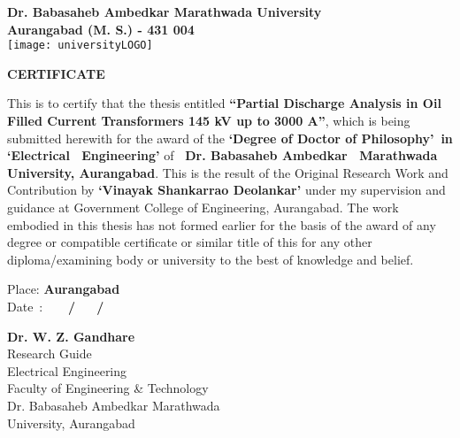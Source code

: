 \begin{center}
\large \textbf{Dr. Babasaheb Ambedkar Marathwada University\\
Aurangabad (M. S.) - 431 004}\\
\vspace{0.5cm}
\texttt{[image: universityLOGO]}\\
\vspace{0.5cm}
\textbf{\large CERTIFICATE}\\
\end{center}
\normalsize This is to certify that the thesis entitled \textbf{\textquotedblleft Partial Discharge Analysis in Oil Filled Current Transformers 145 kV up to 3000 A\textquotedblright}, which is being submitted herewith for the award of the \textbf{\textquoteleft Degree of Doctor of Philosophy\textquoteright ~in \textquoteleft Electrical ~Engineering\textquoteright} of \textbf{~Dr. Babasaheb Ambedkar ~Marathwada University, Aurangabad}. This is the result of the Original Research Work and Contribution by \textbf{\textquoteleft Vinayak Shankarrao Deolankar\textquoteright} under my supervision and guidance at Government College of Engineering, Aurangabad. The work embodied in this thesis has not formed earlier for the basis of the award of any degree or compatible certificate or similar title of this for any other diploma/examining body or university to the best of knowledge and belief. 

\vspace{0.5cm}
Place: \textbf{Aurangabad}\\
Date~: \textbf{~~~/~~~/}\\

\hspace{2.2in}
\begin{minipage}{4in}
\vspace{0.5in}
\begin{center}
\textbf{Dr. W. Z. Gandhare}\\
Research Guide\\
Electrical Engineering\\
Faculty of Engineering \& Technology\\
Dr. Babasaheb Ambedkar Marathwada\\University, Aurangabad\\
\end{center}
\end{minipage}

